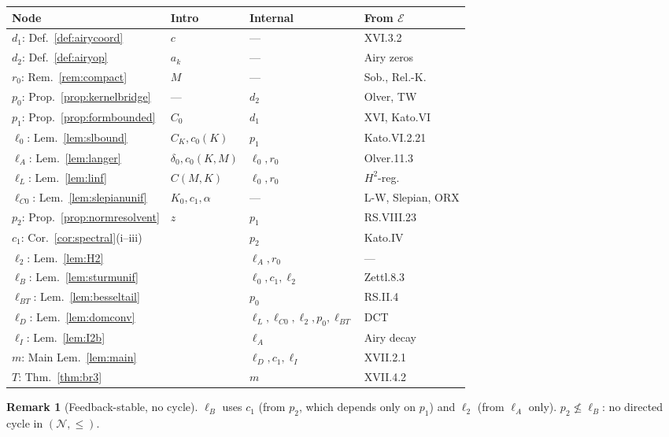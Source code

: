 \documentclass[12pt,a4paper]{amsart}
\theoremstyle{definition}
\newtheorem{remark}[theorem]{Remark}
\begin{document}
\begin{center}
\renewcommand{\arraystretch}{1.2}
\begin{tabular}{l l l l}
\toprule
\textbf{Node} & \textbf{Intro} & \textbf{Internal} & \textbf{From $\mathcal{E}$} \\
\midrule
$d_1$: Def.~\ref{def:airycoord} & $c$ & --- & XVI.3.2 \\
$d_2$: Def.~\ref{def:airyop} & $a_k$ & --- & Airy zeros \\
$r_0$: Rem.~\ref{rem:compact} & $M$ & --- & Sob., Rel.-K. \\
$p_0$: Prop.~\ref{prop:kernelbridge} & --- & $d_2$ & Olver, TW \\
$p_1$: Prop.~\ref{prop:formbounded} & $C_0$ & $d_1$ & XVI, Kato.VI \\
\hline
$\ell_0$: Lem.~\ref{lem:slbound} & $C_K,c_0(K)$ & $p_1$ & Kato.VI.2.21 \\
$\ell_A$: Lem.~\ref{lem:langer} & $\delta_0,c_0(K,M)$ & $\ell_0,r_0$ & Olver.11.3 \\
$\ell_L$: Lem.~\ref{lem:linf} & $C(M,K)$ & $\ell_0,r_0$ & $H^2$-reg. \\
$\ell_{C0}$: Lem.~\ref{lem:slepianunif} & $K_0,c_1,\alpha$ & --- & L-W, Slepian, ORX \\
$p_2$: Prop.~\ref{prop:normresolvent} & $z$ & $p_1$ & RS.VIII.23 \\
\hline
$c_1$: Cor.~\ref{cor:spectral}(i--iii) & & $p_2$ & Kato.IV \\
$\ell_2$: Lem.~\ref{lem:H2} & & $\ell_A,r_0$ & --- \\
$\ell_B$: Lem.~\ref{lem:sturmunif} & & $\ell_0,c_1,\ell_2$ & Zettl.8.3 \\
$\ell_{BT}$: Lem.~\ref{lem:besseltail} & & $p_0$ & RS.II.4 \\
$\ell_D$: Lem.~\ref{lem:domconv} & & $\ell_L,\ell_{C0},\ell_2,p_0,\ell_{BT}$ & DCT \\
$\ell_I$: Lem.~\ref{lem:I2b} & & $\ell_A$ & Airy decay \\
\hline
$m$: Main Lem.~\ref{lem:main} & & $\ell_D,c_1,\ell_I$ & XVII.2.1 \\
$T$: Thm.~\ref{thm:br3} & & $m$ & XVII.4.2 \\
\bottomrule
\end{tabular}
\end{center}

\begin{remark}[Feedback-stable, no cycle]
\label{rem:feedback}
$\ell_B$ uses $c_1$ (from $p_2$, which depends only on $p_1$)
and $\ell_2$ (from $\ell_A$ only).
$p_2\not\leq\ell_B$: no directed cycle in $(\mathcal{N},\leq)$.
\end{remark}
\end{document}

